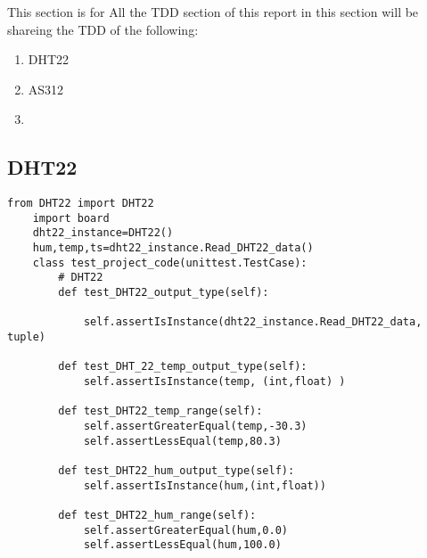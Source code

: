 This section is  for All  the TDD section of  this  report in this  section will be  shareing the TDD of the following:
\begin{enumerate}
    \item DHT22
    \item AS312
    \item 
\end{enumerate}
\subsection{DHT22}
\begin{lstlisting}[style=mystyle,caption={DHT22 unit test}]
    from DHT22 import DHT22
    import board
    dht22_instance=DHT22()
    hum,temp,ts=dht22_instance.Read_DHT22_data()
    class test_project_code(unittest.TestCase):
        # DHT22
        def test_DHT22_output_type(self):
           
            self.assertIsInstance(dht22_instance.Read_DHT22_data, tuple)
    
        def test_DHT_22_temp_output_type(self):
            self.assertIsInstance(temp, (int,float) )
    
        def test_DHT22_temp_range(self):
            self.assertGreaterEqual(temp,-30.3)
            self.assertLessEqual(temp,80.3)
    
        def test_DHT22_hum_output_type(self):
            self.assertIsInstance(hum,(int,float))
    
        def test_DHT22_hum_range(self):
            self.assertGreaterEqual(hum,0.0)
            self.assertLessEqual(hum,100.0)  
\end{lstlisting}